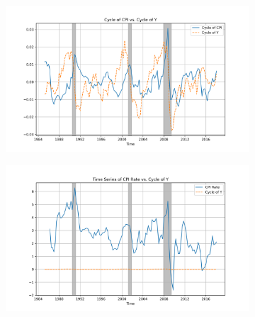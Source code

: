\documentclass{article}
\begin{document}
\begin{figure}[H!]
\begin{subfigure}{0.45\textwidth}
  \centering
  \includegraphics[width=\linewidth]{CPI_cycle_vs_Y_cycle.png}
\end{subfigure}%
\hspace{0.05\textwidth} %
\begin{subfigure}{0.45\textwidth}
  \centering
  \includegraphics[width=\linewidth]{CPI Rate_vs_Y_cycle.png}
\end{subfigure}

\vspace{1em} %


\end{figure}
\end{document}
